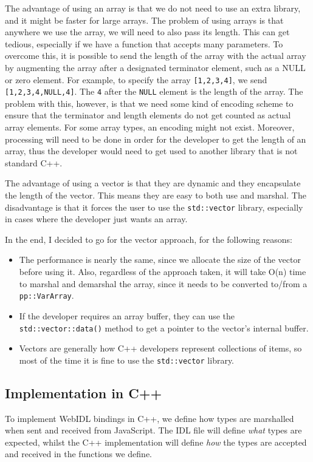The advantage of using an array is that we do not need to use an extra library, and it might be faster for large arrays. The problem of using arrays is that anywhere we use the array, we will need to also pass its length. This can get tedious, especially if we have a function that accepts many parameters. To overcome this, it is possible to send the length of the array with the actual array by augmenting the array after a designated terminator element, such as a NULL or zero element. For example, to specify the array \lstinline{[1,2,3,4]}, we send \lstinline{[1,2,3,4,NULL,4]}. The \lstinline{4} after the \lstinline{NULL} element is the length of the array. The problem with this, however, is that we need some kind of encoding scheme to ensure that the terminator and length elements do not get counted as actual array elements. For some array types, an encoding might not exist. Moreover, processing will need to be done in order for the developer to get the length of an array, thus the developer would need to get used to another library that is not standard C++.

The advantage of using a vector is that they are dynamic and they encapsulate the length of the vector. This means they are easy to both use and marshal. The disadvantage is that it forces the user to use the \lstinline{std::vector} library, especially in cases where the developer just wants an array.

In the end, I decided to go for the vector approach, for the following reasons:

\begin{itemize}
	\item The performance is nearly the same, since we allocate the size of the vector before using it. Also, regardless of the approach taken, it will take O(n) time to marshal and demarshal the array, since it needs to be converted to/from a \lstinline{pp::VarArray}.
	\item If the developer requires an array buffer, they can use the \lstinline{std::vector::data()} method to get a pointer to the vector's internal buffer.
	\item Vectors are generally how C++ developers represent collections of items, so most of the time it is fine to use the \lstinline{std::vector} library.
\end{itemize}


\subsection{Implementation in C++} %
\label{sub:webidl_implementation_in_cpp_}
To implement WebIDL bindings in C++, we define how types are marshalled when sent and received from JavaScript. The IDL file will define \emph{what} types are expected, whilst the C++ implementation will define \emph{how} the types are accepted and received in the functions we define.

